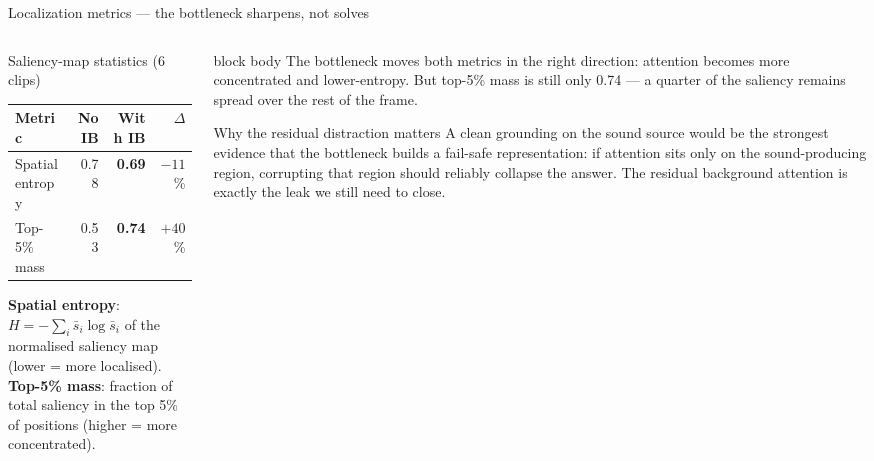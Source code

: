 \documentclass[10pt,aspectratio=169]{beamer}
\begin{document}
\begin{frame}{Localization metrics --- the bottleneck sharpens, not solves}

\begin{columns}[T]
\begin{column}{0.50\textwidth}

\begin{block}{Saliency-map statistics (6 clips)}
{\footnotesize
\renewcommand{\arraystretch}{1.2}
\begin{tabular}{l r r r}
\toprule
\textbf{Metric} & \textbf{No IB} & \textbf{With IB} & \textbf{$\Delta$} \\
\midrule
Spatial entropy & 0.78 & \textbf{0.69} & $-11$\,\% \\
Top-5\% mass    & 0.53 & \textbf{0.74} & $+40$\,\% \\
\bottomrule
\end{tabular}}
\vspace{4pt}
{\footnotesize
\textbf{Spatial entropy}: $H=-\sum_i \bar s_i \log \bar s_i$ of the normalised
saliency map (lower = more localised).\\
\textbf{Top-5\% mass}: fraction of total saliency in the top 5\% of positions
(higher = more concentrated).}
\end{block}

\end{column}

\begin{column}{0.47\textwidth}

\begin{beamercolorbox}[sep=5pt,rounded=true,colsep*=0pt]{block body}
{\footnotesize
The bottleneck moves both metrics in the right direction: attention becomes more
concentrated and lower-entropy. But top-5\% mass is still only 0.74 --- a quarter
of the saliency remains spread over the rest of the frame.}
\end{beamercolorbox}

\vspace{6pt}

\begin{block}{Why the residual distraction matters}
{\footnotesize
A clean grounding on the sound source would be the strongest evidence that the
bottleneck builds a fail-safe representation: if attention sits only on the
sound-producing region, corrupting that region should reliably collapse the
answer. The residual background attention is exactly the leak we still need to
close.}
\end{block}

\end{column}
\end{columns}

\end{frame}
\end{document}

